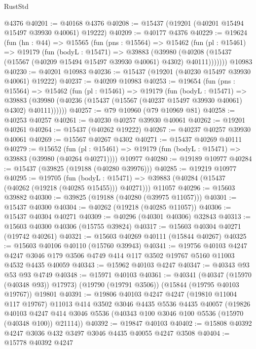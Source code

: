 \begin{lexlean}{RustStd}
\begin{coremodule}
    @4376
@40201 := @40168 @4376
@40208 := @15437 (@19201 (@40201 @15494 @15497 @39930 @40061) @19222)
@40209 := @40177 @4376
@40229 := @19624
    (fun (hn : @44) =>
    @15565
      (fun (pns : @15564) =>
      @15462
        (fun (pl : @15461) =>
        @19179
          (fun (bodyL : @15471) =>
          @39883
            (@39980
              (@40208 (@15437 (@15567 (@40209 @15494 @15497 @39930 @40061) @4302) @40111)))))))
    @10983
@40230 := @40201 @10983
@40236 := @15437 (@19201 (@40230 @15497 @39930 @40061) @19222)
@40237 := @40209 @10983
@40253 := @19654
    (fun (pns : @15564) =>
    @15462
      (fun (pl : @15461) =>
      @19179
        (fun (bodyL : @15471) =>
        @39883 (@39980 (@40236 (@15437 (@15567 (@40237 @15497 @39930 @40061) @4302) @40111))))))
@40257 := @79 @10960 (@79 @10969 @81)
@40258 := @40253 @40257
@40261 := @40230 @40257 @39930 @40061
@40262 := @19201 @40261
@40264 := @15437 (@40262 @19222)
@40267 := @40237 @40257 @39930 @40061
@40269 := @15567 @40267 @4302
@40271 := @15437 @40269 @40111
@40279 := @15652
    (fun (pl : @15461) => @19179 (fun (bodyL : @15471) => @39883 (@39980 (@40264 @40271))))
    @10977
@40280 := @19189 @10977
@40284 := @15437 (@39825 (@19188 (@40280 @39976)))
@40285 := @19219 @10977
@40295 := @19705
    (fun (bodyL : @15471) => @39883 (@40284 (@15437 (@40262 (@19218 (@40285 @15455))) @40271)))
    @11057
@40296 := @15603 @39882
@40300 := @39825 (@19188 (@40280 (@39975 @11057)))
@40301 := @15437 @40300
@40304 := @40262 (@19218 (@40285 @11057))
@40306 := @15437 @40304 @40271
@40309 := @40296 (@40301 @40306) @32843
@40313 := @15603 @40300 @40306 (@15755 @39824)
@40317 := @15603 @40304 @40271 (@19742 @40261)
@40321 := @15603 @40269 @40111 (@15844 @40267)
@40325 := @15603 @40106 @40110 (@15760 @39943)
@40341 := @19756
    @40103
    @4247
    @4247
    @3046
    @179
    @3506
    @4749
    @414
    @117
    @3502
    @19767
    @5160
    @11003
    @4532
    @4435
    @40059
@40343 := @15962 @40103 @4247
@40347 := @40343 @93 @53 @93 @4749
@40348 := @15971 @40103
@40361 := @40341
    (@40347 (@15970 (@40348 @93)) @17973)
    (@19790 (@19791 @3506))
    (@15844 (@19795 @40103 @19767))
    @19801
@40391 := @19806
    @40103
    @4247
    @4247
    (@19810 @11004 @117 @19767)
    @11013
    @414
    @3502
    @3046
    @4435
    @5536
    @4435
    @40057
    (@19826
      @40103
      @4247
      @414
      @3046
      @5536
      (@40343 @100 @3046 @100 @5536 (@15970 (@40348 @100)) @21114))
@40392 := @19847 @40103
@40402 := @15808 @40392 @4247 @3036 @432 @3497 @3046 @4435 @40055 @4247 @3508
@40404 := @15778 @40392 @4247

\end{coremodule}
\end{lexlean}
